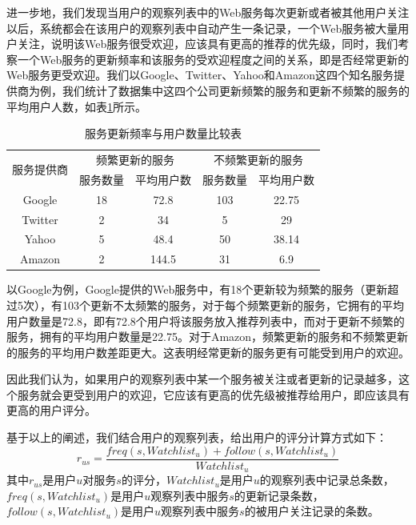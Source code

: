 \documentclass[master,winfonts]{njuthesis}
\begin{document}
进一步地，我们发现当用户的观察列表中的Web服务每次更新或者被其他用户关注以后，系统都会在该用户的观察列表中自动产生一条记录，一个Web服务被大量用户关注，说明该Web服务很受欢迎，应该具有更高的推荐的优先级，同时，我们考察一个Web服务的更新频率和该服务的受欢迎程度之间的关系，即是否经常更新的Web服务更受欢迎。我们以Google、Twitter、Yahoo和Amazon这四个知名服务提供商为例，我们统计了数据集中这四个公司更新频繁的服务和更新不频繁的服务的平均用户人数，如表\ref{table3-1}所示。
\begin{table}[h]
\centering
\caption{服务更新频率与用户数量比较表}
\label{table3-1}
\begin{tabular}{|c|c|c|c|c|}
\hline
\multirow{2}{*}{服务提供商} & \multicolumn{2}{c|}{频繁更新的服务} & \multicolumn{2}{c|}{不频繁更新的服务} \\ \cline{2-5} 
                       & 服务数量         & 平均用户数         & 服务数量          & 平均用户数         \\ \hline
Google                 & 18           & 72.8          & 103           & 22.75         \\ \hline
Twitter                & 2            & 34            & 5             & 29            \\ \hline
Yahoo                  & 5            & 48.4          & 50            & 38.14         \\ \hline
Amazon                 & 2            & 144.5         & 31            & 6.9           \\ \hline
\end{tabular}
\end{table}
以Google为例，Google提供的Web服务中，有18个更新较为频繁的服务（更新超过5次），有103个更新不太频繁的服务，对于每个频繁更新的服务，它拥有的平均用户数量是72.8，即有72.8个用户将该服务放入推荐列表中，而对于更新不频繁的服务，拥有的平均用户数量是22.75。对于Amazon，频繁更新的服务和不频繁更新的服务的平均用户数差距更大。这表明经常更新的服务更有可能受到用户的欢迎。

因此我们认为，如果用户的观察列表中某一个服务被关注或者更新的记录越多，这个服务就会更受到用户的欢迎，它应该有更高的优先级被推荐给用户，即应该具有更高的用户评分。

基于以上的阐述，我们结合用户的观察列表，给出用户的评分计算方式如下：
\begin{equation}\label{eq:3-1}
r_{us} = \frac{freq(s,Watchlist_u)+follow(s,Watchlist_u)}{Watchlist_u}
\end{equation}
其中$r_{us}$是用户$u$对服务$s$的评分，$Watchlist_u$是用户$u$的观察列表中记录总条数，$freq(s,Watchlist_u)$是用户$u$观察列表中服务$s$的更新记录条数，$follow(s,Watchlist_u)$是用户$u$观察列表中服务$s$的被用户关注记录的条数。
\end{document}
